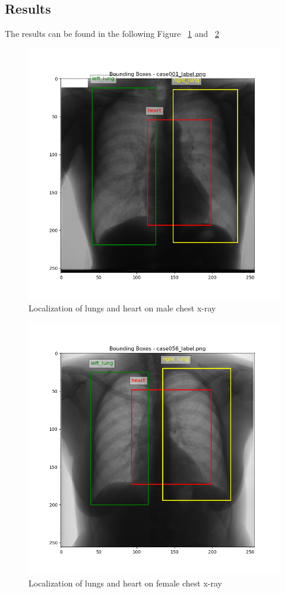 \documentclass[10pt,twocolumn,letterpaper]{article}
\begin{document}
\subsection{Results}
The results can be found in the following Figure ~\ref{fig:male_local} and ~\ref{fig:female_local}
\begin{figure}[h!]
    \centering
    \includegraphics[width=1\linewidth]{bounding_boxes_case001_label.png}
    \caption{Localization of lungs and heart on male chest x-ray}
    \label{fig:male_local}
    \end{figure}
\begin{figure}[h!]
    \centering
    \includegraphics[width=1\linewidth]{bounding_boxes_case056_label.png}
    \caption{Localization of lungs and heart on female chest x-ray}
    \label{fig:female_local}

\end{figure}

{\small



}
\end{document}
